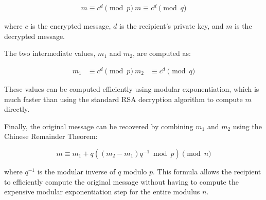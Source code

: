 \documentclass[12pt,openany]{book}
\theoremstyle{definition}
\begin{document}
	$$\begin{aligned} m \equiv c^d \pmod{p}\ m \equiv c^d \pmod{q}\end{aligned}$$
	
	where $c$ is the encrypted message, $d$ is the recipient's private key, and $m$ is the decrypted message.
	
	The two intermediate values, $m_1$ and $m_2$, are computed as:
	
	$$\begin{aligned} m_1 &\equiv c^d \pmod{p}\ m_2 &\equiv c^d \pmod{q}\end{aligned}$$
	
	These values can be computed efficiently using modular exponentiation, which is much faster than using the standard RSA decryption algorithm to compute $m$ directly.
	
	Finally, the original message can be recovered by combining $m_1$ and $m_2$ using the Chinese Remainder Theorem:
	
	$$m \equiv m_1 + q((m_2 - m_1)q^{-1} \bmod p) \pmod n$$
	
	where $q^{-1}$ is the modular inverse of $q$ modulo $p$. This formula allows the recipient to efficiently compute the original message without having to compute the expensive modular exponentiation step for the entire modulus $n$.
	
\end{document}
